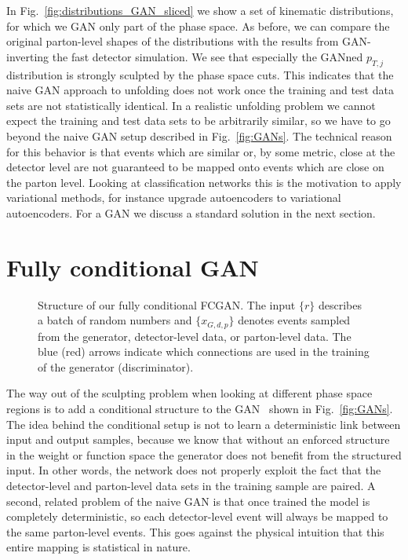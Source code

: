 In Fig.~\ref{fig:distributions_GAN_sliced} we show a set of kinematic
distributions, for which we GAN only part of the phase space. As
before, we can compare the original parton-level shapes of the
distributions with the results from GAN-inverting the fast detector
simulation.  We see that especially the GANned $p_{T,j}$ distribution
is strongly sculpted by the phase space cuts. This indicates that the
naive GAN approach to unfolding does not work once the training and
test data sets are not statistically identical. In a realistic
unfolding problem we cannot expect the training and test data sets to
be arbitrarily similar, so we have to go beyond the naive GAN setup
described in Fig.~\ref{fig:GANs}. The technical reason for this
behavior is that events which are similar or, by some metric, close at
the detector level are not guaranteed to be mapped onto events which
are close on the parton level. Looking at classification networks this
is the motivation to apply variational methods, for instance upgrade
autoencoders to variational autoencoders.  For a GAN we discuss a
standard solution in the next section.

\section{Fully conditional GAN}
\label{sec:fcgan}

\begin{figure}[t]
\centering

\caption{Structure of our fully conditional FCGAN. The
  input $\{r\}$ describes a batch of random numbers and $\{ x_{G,d,p}
  \}$ denotes events sampled from the generator, detector-level data,
  or parton-level data. The blue (red) arrows indicate which
  connections are used in the training of the generator
  (discriminator).}
\label{fig:FCGAN}
\end{figure}
The way out of the sculpting problem when looking at different phase
space regions is to add a conditional structure to the
GAN~\cite{cond_gan} shown in Fig.~\ref{fig:GANs}. The idea behind the
conditional setup is not to learn a deterministic link between input
and output samples, because we know that without an enforced structure
in the weight or function space the generator does not benefit from
the structured input. In other words, the network does not properly
exploit the fact that the detector-level and parton-level data sets in
the training sample are paired.  A second, related problem of the
naive GAN is that once trained the model is completely deterministic,
so each detector-level event will always be mapped to the same
parton-level events. This goes against the physical intuition that
this entire mapping is statistical in nature.

